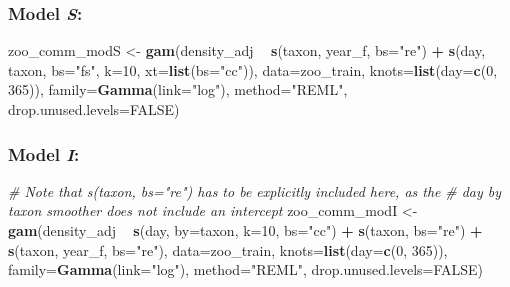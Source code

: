 \documentclass[12pt]{article}
\newenvironment{Shaded}{\begin{snugshade}}{\end{snugshade}}
\newcommand{\KeywordTok}[1]{\textcolor[rgb]{0.13,0.29,0.53}{\textbf{#1}}}
\newcommand{\DataTypeTok}[1]{\textcolor[rgb]{0.13,0.29,0.53}{#1}}
\newcommand{\DecValTok}[1]{\textcolor[rgb]{0.00,0.00,0.81}{#1}}
\newcommand{\StringTok}[1]{\textcolor[rgb]{0.31,0.60,0.02}{#1}}
\newcommand{\CommentTok}[1]{\textcolor[rgb]{0.56,0.35,0.01}{\textit{#1}}}
\newcommand{\OtherTok}[1]{\textcolor[rgb]{0.56,0.35,0.01}{#1}}
\newcommand{\OperatorTok}[1]{\textcolor[rgb]{0.81,0.36,0.00}{\textbf{#1}}}
\newcommand{\NormalTok}[1]{#1}
\begin{document}
\subsubsection{\texorpdfstring{Model
\emph{S}:}{Model S:}}\label{model-s-1}

\begin{Shaded}
\begin{Highlighting}[]
\NormalTok{zoo_comm_modS <-}\StringTok{ }\KeywordTok{gam}\NormalTok{(density_adj }\OperatorTok{~}\StringTok{ }\KeywordTok{s}\NormalTok{(taxon, year_f, }\DataTypeTok{bs=}\StringTok{"re"}\NormalTok{) }\OperatorTok{+}
\StringTok{                       }\KeywordTok{s}\NormalTok{(day, taxon, }\DataTypeTok{bs=}\StringTok{"fs"}\NormalTok{, }\DataTypeTok{k=}\DecValTok{10}\NormalTok{, }\DataTypeTok{xt=}\KeywordTok{list}\NormalTok{(}\DataTypeTok{bs=}\StringTok{"cc"}\NormalTok{)),}
                     \DataTypeTok{data=}\NormalTok{zoo_train, }\DataTypeTok{knots=}\KeywordTok{list}\NormalTok{(}\DataTypeTok{day=}\KeywordTok{c}\NormalTok{(}\DecValTok{0}\NormalTok{, }\DecValTok{365}\NormalTok{)),}
                     \DataTypeTok{family=}\KeywordTok{Gamma}\NormalTok{(}\DataTypeTok{link=}\StringTok{"log"}\NormalTok{), }\DataTypeTok{method=}\StringTok{"REML"}\NormalTok{,}
                     \DataTypeTok{drop.unused.levels=}\OtherTok{FALSE}\NormalTok{)}
\end{Highlighting}
\end{Shaded}

\subsubsection{\texorpdfstring{Model
\emph{I}:}{Model I:}}\label{model-i-1}

\begin{Shaded}
\begin{Highlighting}[]
\CommentTok{# Note that s(taxon, bs="re") has to be explicitly included here, as the }
\CommentTok{# day by taxon smoother does not include an intercept}
\NormalTok{zoo_comm_modI <-}\StringTok{ }\KeywordTok{gam}\NormalTok{(density_adj }\OperatorTok{~}\StringTok{ }\KeywordTok{s}\NormalTok{(day, }\DataTypeTok{by=}\NormalTok{taxon, }\DataTypeTok{k=}\DecValTok{10}\NormalTok{, }\DataTypeTok{bs=}\StringTok{"cc"}\NormalTok{) }\OperatorTok{+}\StringTok{ }
\StringTok{                       }\KeywordTok{s}\NormalTok{(taxon, }\DataTypeTok{bs=}\StringTok{"re"}\NormalTok{) }\OperatorTok{+}\StringTok{ }\KeywordTok{s}\NormalTok{(taxon, year_f, }\DataTypeTok{bs=}\StringTok{"re"}\NormalTok{),}
                     \DataTypeTok{data=}\NormalTok{zoo_train, }\DataTypeTok{knots=}\KeywordTok{list}\NormalTok{(}\DataTypeTok{day=}\KeywordTok{c}\NormalTok{(}\DecValTok{0}\NormalTok{, }\DecValTok{365}\NormalTok{)),}
                     \DataTypeTok{family=}\KeywordTok{Gamma}\NormalTok{(}\DataTypeTok{link=}\StringTok{"log"}\NormalTok{), }\DataTypeTok{method=}\StringTok{"REML"}\NormalTok{,}
                     \DataTypeTok{drop.unused.levels=}\OtherTok{FALSE}\NormalTok{)}
\end{Highlighting}
\end{Shaded}
\end{document}
